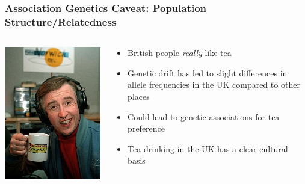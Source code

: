 \documentclass[xcolor=dvipsnames]{beamer}
\begin{document}
\begin{frame}
	
	\frametitle{Association Genetics Caveat: Population Structure/Relatedness}


\begin{columns}
	\begin{column}{0.5\textwidth}
		\includegraphics[keepaspectratio, width  = \textwidth]{img/alan}				
	\end{column}
	\begin{column}{0.5\textwidth}
		\begin{itemize}
			\item British people \textit{really} like tea 
			\vspace{7.5pt}
			\item Genetic drift has led to slight differences in allele frequencies in the UK compared to other places
			\vspace{7.5pt}
			\item Could lead to genetic associations for tea preference
			
			\vspace{10pt}
			\item Tea drinking in the UK has a clear cultural basis
		\end{itemize}
	\end{column}
\end{columns}
\end{frame}
\end{document}
